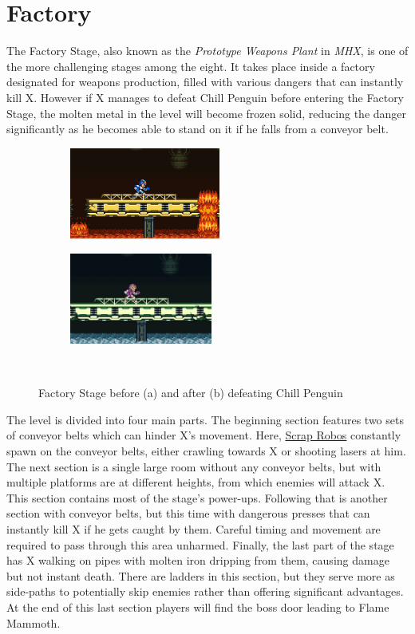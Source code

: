 \section{Factory} 
The Factory Stage, also known as the \textit{Prototype Weapons Plant} in \textit{MHX}, is one of the more challenging stages among the eight. It takes place inside a factory designated for weapons production, filled with various dangers that can instantly kill X. However if X manages to defeat Chill Penguin before entering the Factory Stage, the molten metal in the level will become frozen solid, reducing the danger significantly as he becomes able to stand on it if he falls from a conveyor belt.
\begin{figure}[htp]
	\centering
	\begin{subfigure}{0.42\textwidth}
		\centering
		\includegraphics[height=3cm]{figures/X1/Flame_mammoth/Flame_fire.jpg}
		\caption{}
	\end{subfigure}
	\begin{subfigure}{0.42\textwidth}
		\centering
		\includegraphics[height=3cm]{figures/X1/Flame_mammoth/Flame_frozen.jpg}
		\caption{}
	\end{subfigure}\\
	\caption{Factory Stage before (a) and after (b)  defeating Chill Penguin}
\end{figure}
The level is divided into four main parts. The beginning section features two sets of conveyor belts which can hinder X's movement. Here, \hyperlink{enem:Scrap_Robo}{Scrap Robos} constantly spawn on the conveyor belts, either crawling towards X or shooting lasers at him. The next section is a single large room without any conveyor belts, but with multiple platforms are at different heights, from which enemies will attack X. This section contains most of the stage's power-ups. Following that is another section with conveyor belts, but this time with dangerous presses that can instantly kill X if he gets caught by them. Careful timing and movement are required to pass through this area unharmed. Finally, the last part of the stage has X walking on pipes with molten iron dripping from them, causing damage but not instant death. There are ladders in this section, but they serve more as side-paths to potentially skip enemies rather than offering significant advantages. At the end of this last section players will find the boss door leading to Flame Mammoth.

